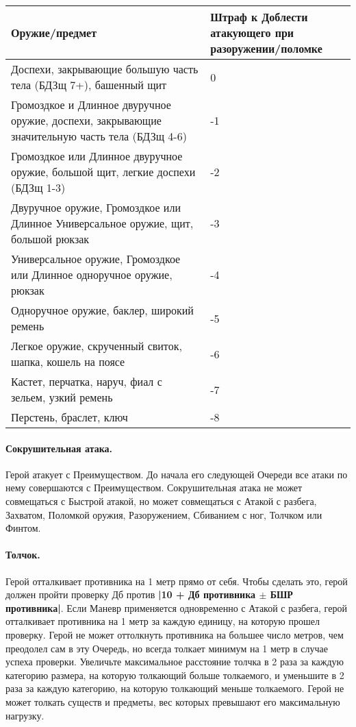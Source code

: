 \begin{center}
\begin{tabular}{|p{10cm}|p{4cm}|}
\hline
Оружие/предмет & Штраф к Доблести атакующего при разоружении/поломке \\ \hline
Доспехи, закрывающие большую часть тела (БДЗщ 7+), башенный щит & 0 \\ \hline
Громоздкое и Длинное двуручное оружие, доспехи, закрывающие значительную часть тела (БДЗщ 4-6) & -1 \\ \hline
Громоздкое или Длинное двуручное оружие, большой щит, легкие доспехи (БДЗщ 1-3) & -2 \\ \hline
Двуручное оружие, Громоздкое или Длинное Универсальное оружие, щит, большой рюкзак & -3 \\ \hline
Универсальное оружие, Громоздкое или Длинное одноручное оружие, рюкзак & -4 \\ \hline
Одноручное оружие, баклер, широкий ремень & -5 \\ \hline
Легкое оружие, скрученный свиток, шапка, кошель на поясе & -6 \\ \hline
Кастет, перчатка, наруч, фиал с зельем, узкий ремень & -7 \\ \hline
Перстень, браслет, ключ & -8 \\ \hline
\end{tabular}
\end{center}


\paragraph{Сокрушительная атака.} Герой атакует с Преимуществом. До начала его следующей Очереди все атаки по нему совершаются с Преимуществом. Сокрушительная атака не может совмещаться с Быстрой атакой, но может совмещаться с Атакой с разбега, Захватом, Поломкой оружия, Разоружением, Сбиванием с ног, Толчком или Финтом.
\paragraph{Толчок.} Герой отталкивает противника на 1 метр прямо от себя. Чтобы сделать это, герой должен пройти проверку Дб против \textbf{|10 + Дб противника $\pm$ БШР противника|}.
\newline
Если Маневр применяется одновременно с Атакой с разбега, герой отталкивает противника на 1 метр за каждую единицу, на которую прошел проверку. Герой не может оттолкнуть противника на большее число метров, чем преодолел сам в эту Очередь, но всегда толкает минимум на 1 метр в случае успеха проверки.
Увеличьте максимальное расстояние толчка в 2 раза за каждую категорию размера, на которую толкающий больше толкаемого, и уменьшите в 2 раза за каждую категорию, на которую толкающий меньше толкаемого.
\newline
Герой не может толкать существ и предметы, вес которых превышают его максимальную нагрузку.
